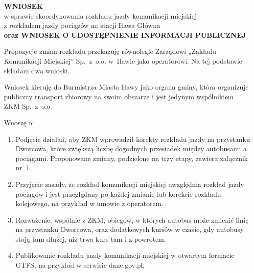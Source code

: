 



\begin{center}
{\large\bfseries WNIOSEK}\\[2pt]
w sprawie skoordynowania rozkładu jazdy komunikacji miejskiej\\
z rozkładem jazdy pociągów na stacji Iława Główna\\[6pt]
{\large\bfseries oraz WNIOSEK O UDOSTĘPNIENIE INFORMACJI PUBLICZNEJ}
\end{center}

\Wstep{} Propozycje zmian rozkładu przekazuję równolegle Zarządowi „Zakładu Komunikacji Miejskiej” Sp.\ z~o.o. w~Iławie jako operatorowi. Na tej podstawie składam dwa wnioski.


Wniosek kieruję do Burmistrza Miasta Iławy jako organu gminy, która organizuje publiczny transport zbiorowy na swoim obszarze i jest jedynym wspólnikiem ZKM Sp.\ z~o.o.

Wnoszę o:
\begin{enumerate}
\item Podjęcie działań, aby ZKM wprowadził korekty rozkładu jazdy na przystanku Dworcowa, które zwiększą liczbę dogodnych przesiadek między autobusami a pociągami. Proponowane zmiany, podzielone na trzy etapy, zawiera załącznik nr~1.
\item Przyjęcie zasady, że rozkład komunikacji miejskiej uwzględnia rozkład jazdy pociągów i jest przeglądany po każdej zmianie lub korekcie rozkładu kolejowego, na przykład w umowie z operatorem.
\item Rozważenie, wspólnie z ZKM, obiegów, w których autobus może zmienić linię na przystanku Dworcowa, oraz dodatkowych kursów w czasie, gdy autobusy stoją tam dłużej, niż trwa kurs tam i z powrotem.
\item Publikowanie rozkładu jazdy komunikacji miejskiej w otwartym formacie GTFS, na przykład w serwisie dane.gov.pl.
\end{enumerate}

\Uzasadnienie

